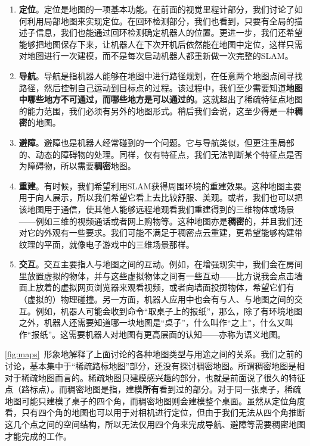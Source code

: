 \begin{enumerate}
	\item \textbf{定位}。定位是地图的一项基本功能。在前面的视觉里程计部分，我们讨论了如何利用局部地图来实现定位。在回环检测部分，我们也看到，只要有全局的描述子信息，我们也能通过回环检测确定机器人的位置。更进一步，我们还希望能够把地图保存下来，让机器人在下次开机后依然能在地图中定位，这样只需对地图进行一次建模，而不是每次启动机器人都重新做一次完整的SLAM。
	\item \textbf{导航}。导航是指机器人能够在地图中进行路径规划，在任意两个地图点间寻找路径，然后控制自己运动到目标点的过程。该过程中，我们至少需要知道\textbf{地图中哪些地方不可通过，而哪些地方是可以通过的}。这就超出了稀疏特征点地图的能力范围，我们必须有另外的地图形式。稍后我们会说，这至少得是一种\textbf{稠密}的地图。
	\item \textbf{避障}。避障也是机器人经常碰到的一个问题。它与导航类似，但更注重局部的、动态的障碍物的处理。同样，仅有特征点，我们无法判断某个特征点是否为障碍物，所以需要\textbf{稠密}地图。
	\item \textbf{重建}。有时候，我们希望利用SLAM获得周围环境的重建效果。这种地图主要用于向人展示，所以我们希望它看上去比较舒服、美观。或者，我们也可以把该地图用于通信，使其他人能够远程地观看我们重建得到的三维物体或场景——例如三维的视频通话或者网上购物等。这种地图亦是\textbf{稠密}的，并且我们还对它的外观有一些要求。我们可能不满足于稠密点云重建，更希望能够构建带纹理的平面，就像电子游戏中的三维场景那样。
	\item \textbf{交互}。交互主要指人与地图之间的互动。例如，在增强现实中，我们会在房间里放置虚拟的物体，并与这些虚拟物体之间有一些互动——比方说我会点击墙面上放着的虚拟网页浏览器来观看视频，或者向墙面投掷物体，希望它们有（虚拟的）物理碰撞。另一方面，机器人应用中也会有与人、与地图之间的交互。例如，机器人可能会收到命令“取桌子上的报纸”，那么，除了有环境地图之外，机器人还需要知道哪一块地图是“桌子”，什么叫作“之上”，什么又叫作“报纸”。这需要机器人对地图有更高层面的认知——亦称为语义地图。
\end{enumerate}

\autoref{fig:maps}~形象地解释了上面讨论的各种地图类型与用途之间的关系。我们之前的讨论，基本集中于“稀疏路标地图”部分，还没有探讨稠密地图。所谓稠密地图是相对于稀疏地图而言的。稀疏地图只建模感兴趣的部分，也就是前面说了很久的特征点（路标点）。而稠密地图是指，建模\textbf{所有}看到过的部分。对于同一张桌子，稀疏地图可能只建模了桌子的四个角，而稠密地图则会建模整个桌面。虽然从定位角度看，只有四个角的地图也可以用于对相机进行定位，但由于我们无法从四个角推断这几个点之间的空间结构，所以无法仅用四个角来完成导航、避障等需要稠密地图才能完成的工作。

